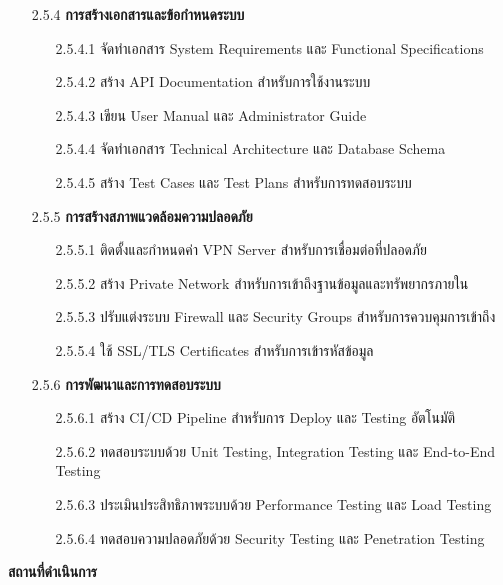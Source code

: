 \documentclass[12pt,a4paper]{article}
\begin{document}
\begin{enumerate}[leftmargin=2cm]
{\begin{enumerate}
            \item[2.5.4] \textbf{การสร้างเอกสารและข้อกำหนดระบบ}
            \begin{enumerate}
                \item[2.5.4.1] จัดทำเอกสาร System Requirements และ Functional Specifications
                \item[2.5.4.2] สร้าง API Documentation สำหรับการใช้งานระบบ
                \item[2.5.4.3] เขียน User Manual และ Administrator Guide
                \item[2.5.4.4] จัดทำเอกสาร Technical Architecture และ Database Schema
                \item[2.5.4.5] สร้าง Test Cases และ Test Plans สำหรับการทดสอบระบบ
            \end{enumerate}

            \item[2.5.5] \textbf{การสร้างสภาพแวดล้อมความปลอดภัย}
            \begin{enumerate}
                \item[2.5.5.1] ติดตั้งและกำหนดค่า VPN Server สำหรับการเชื่อมต่อที่ปลอดภัย
                \item[2.5.5.2] สร้าง Private Network สำหรับการเข้าถึงฐานข้อมูลและทรัพยากรภายใน
                \item[2.5.5.3] ปรับแต่งระบบ Firewall และ Security Groups สำหรับการควบคุมการเข้าถึง
                \item[2.5.5.4] ใช้ SSL/TLS Certificates สำหรับการเข้ารหัสข้อมูล
            \end{enumerate}

            \item[2.5.6] \textbf{การพัฒนาและการทดสอบระบบ}
            \begin{enumerate}
                \item[2.5.6.1] สร้าง CI/CD Pipeline สำหรับการ Deploy และ Testing อัตโนมัติ
                \item[2.5.6.2] ทดสอบระบบด้วย Unit Testing, Integration Testing และ End-to-End Testing
                \item[2.5.6.3] ประเมินประสิทธิภาพระบบด้วย Performance Testing และ Load Testing
                \item[2.5.6.4] ทดสอบความปลอดภัยด้วย Security Testing และ Penetration Testing
            \end{enumerate}
        \end{enumerate}

        \textbf{สถานที่ดำเนินการ}

}
\end{enumerate}
\end{document}
